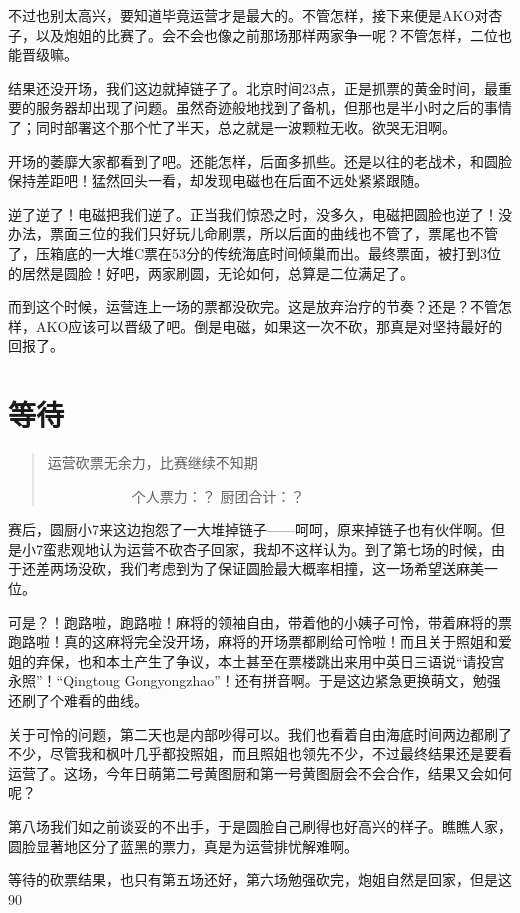 不过也别太高兴，要知道毕竟运营才是最大的。不管怎样，接下来便是AKO对杏子，以及炮姐的比赛了。会不会也像之前那场那样两家争一呢？不管怎样，二位也能晋级嘛。

结果还没开场，我们这边就掉链子了。北京时间23点，正是抓票的黄金时间，最重要的服务器却出现了问题。虽然奇迹般地找到了备机，但那也是半小时之后的事情了；同时部署这个那个忙了半天，总之就是一波颗粒无收。欲哭无泪啊。

开场的萎靡大家都看到了吧。还能怎样，后面多抓些。还是以往的老战术，和圆脸保持差距吧！猛然回头一看，却发现电磁也在后面不远处紧紧跟随。

逆了逆了！电磁把我们逆了。正当我们惊恐之时，没多久，电磁把圆脸也逆了！没办法，票面三位的我们只好玩儿命刷票，所以后面的曲线也不管了，票尾也不管了，压箱底的一大堆C票在53分的传统海底时间倾巢而出。最终票面，被打到3位的居然是圆脸！好吧，两家刷圆，无论如何，总算是二位满足了。

而到这个时候，运营连上一场的票都没砍完。这是放弃治疗的节奏？还是？不管怎样，AKO应该可以晋级了吧。倒是电磁，如果这一次不砍，那真是对坚持最好的回报了。


\chapter{等待}
\begin{quote}
运营砍票无余力，比赛继续不知期

　　　　　　个人票力：？ 厨团合计：？
\end{quote}

赛后，圆厨小7来这边抱怨了一大堆掉链子——呵呵，原来掉链子也有伙伴啊。但是小7蛮悲观地认为运营不砍杏子回家，我却不这样认为。到了第七场的时候，由于还差两场没砍，我们考虑到为了保证圆脸最大概率相撞，这一场希望送麻美一位。

可是？！跑路啦，跑路啦！麻将的领袖自由，带着他的小姨子可怜，带着麻将的票跑路啦！真的这麻将完全没开场，麻将的开场票都刷给可怜啦！而且关于照姐和爱姐的弃保，也和本土产生了争议，本土甚至在票楼跳出来用中英日三语说“请投宫永照”！“Qingtoug Gongyongzhao”！还有拼音啊。于是这边紧急更换萌文，勉强还刷了个难看的曲线。

关于可怜的问题，第二天也是内部吵得可以。我们也看着自由海底时间两边都刷了不少，尽管我和枫叶几乎都投照姐，而且照姐也领先不少，不过最终结果还是要看运营了。这场，今年日萌第二号黄图厨和第一号黄图厨会不会合作，结果又会如何呢？

第八场我们如之前谈妥的不出手，于是圆脸自己刷得也好高兴的样子。瞧瞧人家，圆脸显著地区分了蓝黑的票力，真是为运营排忧解难啊。

等待的砍票结果，也只有第五场还好，第六场勉强砍完，炮姐自然是回家，但是这90%

